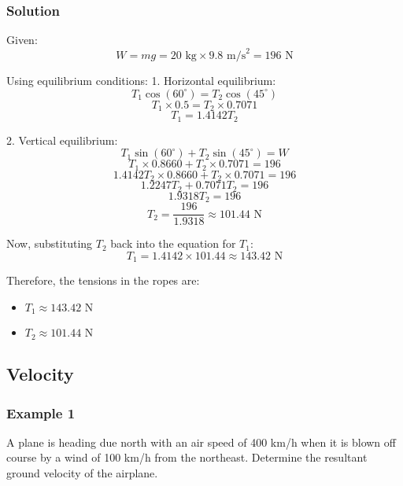 \documentclass{article}
\begin{document}

\subsubsection*{Solution}

Given:
\[
W = mg = 20 \text{ kg} \times 9.8 \text{ m/s}^2 = 196 \text{ N}
\]

Using equilibrium conditions:
1. Horizontal equilibrium:
\[
T_1 \cos(60^\circ) = T_2 \cos(45^\circ)
\]
\[
T_1 \times 0.5 = T_2 \times 0.7071
\]
\[
T_1 = 1.4142 T_2
\]

2. Vertical equilibrium:
\[
T_1 \sin(60^\circ) + T_2 \sin(45^\circ) = W
\]
\[
T_1 \times 0.8660 + T_2 \times 0.7071 = 196
\]
\[
1.4142 T_2 \times 0.8660 + T_2 \times 0.7071 = 196
\]
\[
1.2247 T_2 + 0.7071 T_2 = 196
\]
\[
1.9318 T_2 = 196
\]
\[
T_2 = \frac{196}{1.9318} \approx 101.44 \text{ N}
\]

Now, substituting \( T_2 \) back into the equation for \( T_1 \):
\[
T_1 = 1.4142 \times 101.44 \approx 143.42 \text{ N}
\]

Therefore, the tensions in the ropes are:
\begin{itemize}
    \item \( T_1 \approx 143.42 \text{ N} \)
    \item \( T_2 \approx 101.44 \text{ N} \)
\end{itemize}
\subsection{Velocity}
\subsubsection*{Example 1}
A plane is heading due north with an air speed of 400 km/h when it is blown off course by a wind of 100 km/h from the northeast. Determine the resultant ground velocity of the airplane.
\end{document}
